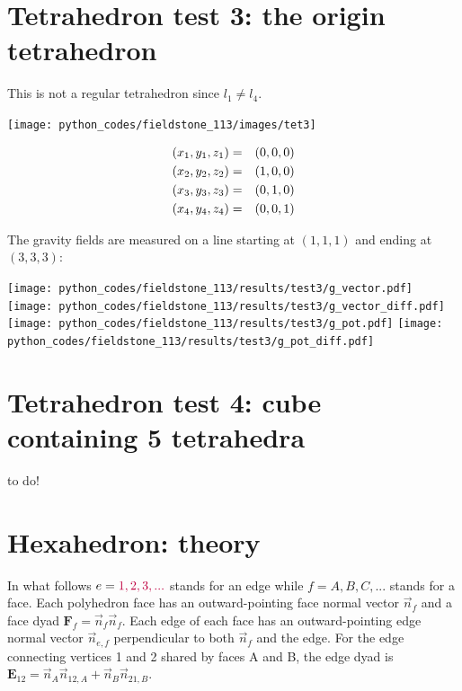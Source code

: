 \section*{Tetrahedron test 3: the origin tetrahedron}

This is not a regular tetrahedron since $l_{1} \neq l_4 $.

\begin{center}
\texttt{[image: python\_codes/fieldstone\_113/images/tet3]}
\end{center}


\begin{eqnarray}
(x_1,y_1,z_1) &=& (0,0,0) \nonumber\\
(x_2,y_2,z_2) &=& (1,0,0) \nonumber\\ 
(x_3,y_3,z_3) &=& (0,1,0) \nonumber\\
(x_4,y_4,z_4) &=& (0,0,1) \nonumber
\end{eqnarray}

The gravity fields are measured on a line starting at $(1,1,1)$ and ending at $(3,3,3)$:

\begin{center}
\texttt{[image: python\_codes/fieldstone\_113/results/test3/g\_vector.pdf]}
\texttt{[image: python\_codes/fieldstone\_113/results/test3/g\_vector\_diff.pdf]}\\
\texttt{[image: python\_codes/fieldstone\_113/results/test3/g\_pot.pdf]}
\texttt{[image: python\_codes/fieldstone\_113/results/test3/g\_pot\_diff.pdf]}
\end{center}


\section*{Tetrahedron test 4: cube containing 5 tetrahedra}

{\color{red} to do!}


\newpage
\section*{Hexahedron: theory}


In what follows $e={\color{purple} 1,2,3,...}$ stands for an edge while $f=A,B,C,...$ stands for a face. 
Each polyhedron face has an outward-pointing face normal vector $\vec{n}_f$
and a face dyad ${\bm F}_f =\vec{n}_f\vec{n}_f $.
Each edge of each face has an outward-pointing edge normal
vector $\vec{n}_{e,f}$ perpendicular to both $\vec{n}_f$ and the edge.
For the edge connecting vertices 1 and 2 shared by faces A and B,
the edge dyad is ${\bm E}_{12}=\vec{n}_A \vec{n}_{12,A}+\vec{n}_B \vec{n}_{21,B}$.

